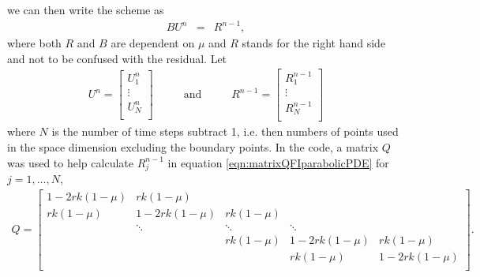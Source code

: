 we can then write the scheme as 
\begin{eqnarray}
BU^{n} &=& {R}^{n-1}, 
\end{eqnarray}
where both $R$ and $B$ are dependent on $\mu$ and $R$ stands for the right hand side and not to be confused with the residual. Let
\begin{eqnarray}
U^{n} = \begin{bmatrix}
U_1^{n}\\
\vdots\\
U_N^{n}\\
\end{bmatrix}
\hspace{1cm} \text{ and }\hspace{1cm}
{R}^{n-1} = \begin{bmatrix}
R_1^{n-1}\\
\vdots\\
R_N^{n-1}\\
\end{bmatrix}
\end{eqnarray}
where $N$ is the number of time steps subtract 1, i.e. then numbers of points used in the space dimension excluding the boundary points.  
In the code, a matrix $Q$ was used to help calculate $R^{n-1}_j$ in equation  \ref{eqn:matrixQFIparabolicPDE} for $j=1,\dots,N$,
\begin{eqnarray}
Q = \begin{bmatrix} \label{eqn:matrixQFIparabolicPDE}
1-2 r k (1-\mu) & r k (1-\mu)  \\
 r k (1-\mu)        & 1-2 r k (1-\mu) &  r k (1-\mu)   \\
                    & \ddots           & \ddots & \ddots \\
            & &         r k (1-\mu)   &1-2 r k (1-\mu)  &  r k (1-\mu) \\
                      &   & &       r k (1-\mu) &  1-2 r k (1-\mu)    \\
\end{bmatrix}.
\end{eqnarray}


